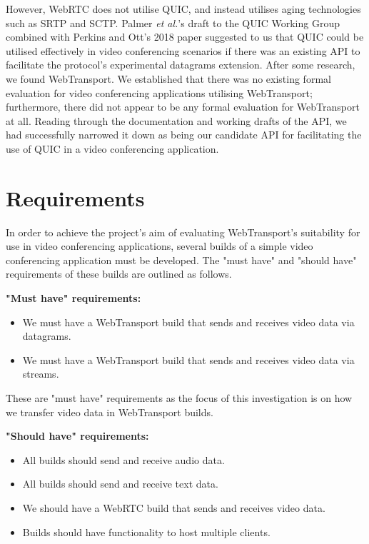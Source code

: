 However, WebRTC does not utilise QUIC, and instead utilises aging technologies such as SRTP and SCTP. Palmer \textit{et al.}'s draft \cite{palmerdraft} to the QUIC Working Group combined with Perkins and Ott's 2018 paper \cite{perkins2018} suggested to us that QUIC could be utilised effectively in video conferencing scenarios if there was an existing API to facilitate the protocol's experimental datagrams extension. After some research, we found WebTransport. We established that there was no existing formal evaluation for video conferencing applications utilising WebTransport; furthermore, there did not appear to be any formal evaluation for WebTransport at all. Reading through the documentation and working drafts of the API, we had successfully narrowed it down as being our candidate API for facilitating the use of QUIC in a video conferencing application.

\section{Requirements}

In order to achieve the project's aim of evaluating WebTransport's suitability for use in video conferencing applications, several builds of a simple video conferencing application must be developed. The "must have" and "should have" requirements of these builds are outlined as follows.

\textbf{"Must have" requirements:}
\begin{itemize}
  \item We must have a WebTransport build that sends and receives video data via datagrams.
  \item We must have a WebTransport build that sends and receives video data via streams.
\end{itemize}

These are "must have" requirements as the focus of this investigation is on how we transfer video data in WebTransport builds.

\textbf{"Should have" requirements:}
\begin{itemize}
  \item All builds should send and receive audio data.
  \item All builds should send and receive text data.
    \item We should have a WebRTC build that sends and receives video data.
    \item Builds should have functionality to host multiple clients.
\end{itemize}

